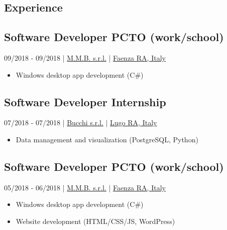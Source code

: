 \documentclass{article}
\begin{document}
\begin{paracol}{2}
%
%

\vfill
\section*{ Experience}

\subsection*{ Software Developer PCTO (work/school)}
 09/2018 - 09/2018 \hfill | \hfill
\href{https://www.mmbsoftware.it/portalemmb/en/home}{ M.M.B. s.r.l.} \hfill | \hfill
\href{https://www.openstreetmap.org/node/1864397767}{ Faenza RA, Italy}
\begin{itemize}
    \item {} Windows desktop app development (C\#)
\end{itemize}

\subsection*{ Software Developer Internship}
 07/2018 - 07/2018 \hfill | \hfill
\href{http://www.bucchi.it/en/}{ Bucchi s.r.l.} \hfill | \hfill
\href{https://www.openstreetmap.org/node/4752486846}{ Lugo RA, Italy}
\begin{itemize}
    \item {} Data management and visualization (PostgreSQL, Python)
\end{itemize}

\subsection*{ Software Developer PCTO (work/school)}
 05/2018 - 06/2018 \hfill | \hfill
\href{https://www.mmbsoftware.it/portalemmb/en/home}{ M.M.B. s.r.l.} \hfill | \hfill
\href{https://www.openstreetmap.org/node/1864397767}{ Faenza RA, Italy}
\begin{itemize}
    \item {} Windows desktop app development (C\#)
    \item {} Website development (HTML/CSS/JS, WordPress)
\end{itemize}


\end{paracol}
\end{document}
